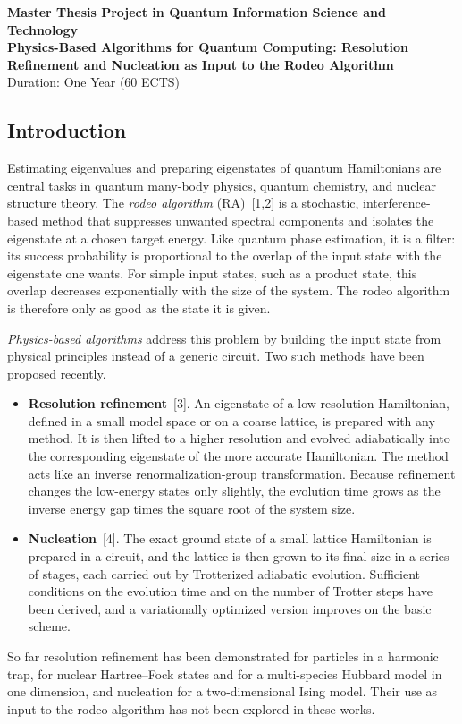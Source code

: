 \documentclass[12pt,a4paper]{article}
\begin{document}
\begin{center}
    {\Large \textbf{Master Thesis Project in Quantum Information Science and Technology}}\\[0.3cm]
    {\large \textbf{Physics-Based Algorithms for Quantum Computing: Resolution Refinement and Nucleation as Input to the Rodeo Algorithm}}\\[0.2cm]
    \vspace{0.3cm}
    {Duration: One Year (60 ECTS)}
\end{center}

\vspace{1cm}


\subsection*{Introduction}

Estimating eigenvalues and preparing eigenstates of quantum
Hamiltonians are central tasks in quantum many-body physics, quantum
chemistry, and nuclear structure theory.  The \emph{rodeo algorithm}
(RA)~[1,2] is a stochastic, interference-based method that suppresses
unwanted spectral components and isolates the eigenstate at a chosen
target energy.  Like quantum phase estimation, it is a filter: its
success probability is proportional to the overlap of the input state
with the eigenstate one wants.  For simple input states, such as a
product state, this overlap decreases exponentially with the size of
the system.  The rodeo algorithm is therefore only as good as the
state it is given.

\emph{Physics-based algorithms} address this problem by building the
input state from physical principles instead of a generic circuit.
Two such methods have been proposed recently.
\begin{itemize}
  \item \textbf{Resolution refinement}~[3].  An eigenstate of a
  low-resolution Hamiltonian, defined in a small model space or on a
  coarse lattice, is prepared with any method.  It is then lifted to
  a higher resolution and evolved adiabatically into the
  corresponding eigenstate of the more accurate Hamiltonian.  The
  method acts like an inverse renormalization-group transformation.
  Because refinement changes the low-energy states only slightly, the
  evolution time grows as the inverse energy gap times the square
  root of the system size.
  \item \textbf{Nucleation}~[4].  The exact ground state of a small
  lattice Hamiltonian is prepared in a circuit, and the lattice is
  then grown to its final size in a series of stages, each carried
  out by Trotterized adiabatic evolution.  Sufficient conditions on
  the evolution time and on the number of Trotter steps have been
  derived, and a variationally optimized version improves on the
  basic scheme.
\end{itemize}
So far resolution refinement has been demonstrated for particles in a
harmonic trap, for nuclear Hartree--Fock states and for a
multi-species Hubbard model in one dimension, and nucleation for a
two-dimensional Ising model.  Their use as input to the rodeo
algorithm has not been explored in these works.
\end{document}
